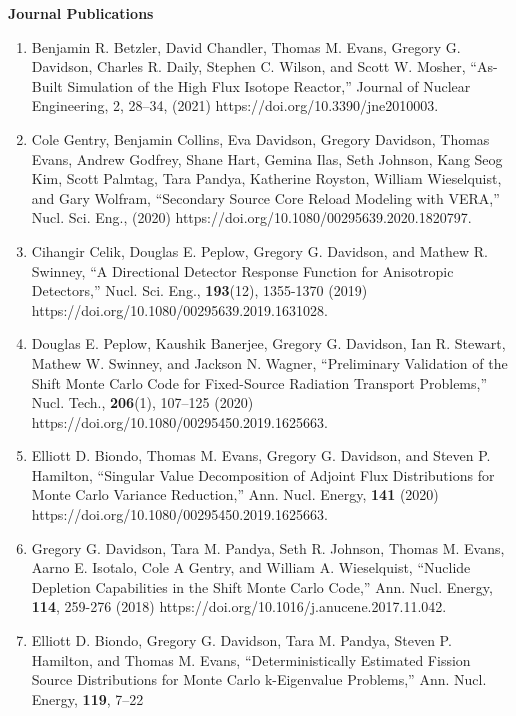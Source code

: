 \documentclass[letterpaper,11pt]{article}
\newlength{\outerbordwidth}
\newcommand{\resheading}[1]{\vspace{8pt}
  \parbox{\textwidth}{\setlength{\FrameSep}{\outerbordwidth}
    \begin{shaded}
      \setlength{\fboxsep}{0pt}\framebox[\textwidth][l]{\setlength{\fboxsep}{4pt}\fcolorbox{shadecolorB}{shadecolorB}{\textbf{\sffamily{\mbox{~}\makebox[6.762in][l]{\large #1} \vphantom{p\^{E}}}}}}
    \end{shaded}
  }\vspace{-5pt}
}
\newcommand{\leftsubheading}[1]{
  \textbf{#1\vspace{-6pt} \\}}
\begin{document}
\resheading{Publications}

\leftsubheading{Journal Publications}
\begin{enumerate}
  \item Benjamin R. Betzler, David Chandler, Thomas M. Evans, Gregory
    G. Davidson, Charles R. Daily, Stephen C. Wilson, and Scott
    W. Mosher, ``As-Built Simulation of the High Flux Isotope
    Reactor,'' Journal of Nuclear Engineering, 2, 28–34, (2021)
    https://doi.org/10.3390/jne2010003.
  \item Cole Gentry, Benjamin Collins, Eva Davidson, Gregory Davidson,
    Thomas Evans, Andrew Godfrey, Shane Hart, Gemina Ilas, Seth
    Johnson, Kang Seog Kim, Scott Palmtag, Tara Pandya, Katherine
    Royston, William Wieselquist, and Gary Wolfram, ``Secondary Source
    Core Reload Modeling with VERA,'' Nucl. Sci. Eng., (2020)
    https://doi.org/10.1080/00295639.2020.1820797.
  \item Cihangir Celik, Douglas E. Peplow, Gregory G. Davidson, and
    Mathew R. Swinney, ``A Directional Detector Response Function for
    Anisotropic Detectors,'' Nucl. Sci. Eng., \textbf{193}(12),
    1355-1370 (2019) https://doi.org/10.1080/00295639.2019.1631028.
  \item Douglas E. Peplow, Kaushik Banerjee, Gregory G. Davidson, Ian
    R. Stewart, Mathew W. Swinney, and Jackson N. Wagner, ``Preliminary
    Validation of the Shift Monte Carlo Code for Fixed-Source
    Radiation Transport Problems,'' Nucl. Tech., \textbf{206}(1),
    107--125 (2020) https://doi.org/10.1080/00295450.2019.1625663.
  \item Elliott D. Biondo, Thomas M. Evans, Gregory G. Davidson, and
    Steven P. Hamilton, ``Singular Value Decomposition of Adjoint Flux
    Distributions for Monte Carlo Variance Reduction,''
    Ann. Nucl. Energy, \textbf{141} (2020)
    https://doi.org/10.1080/00295450.2019.1625663. 
  \item Gregory G. Davidson, Tara M. Pandya, Seth R. Johnson, Thomas
    M. Evans, Aarno E. Isotalo, Cole A Gentry, and William
    A. Wieselquist, ``Nuclide Depletion Capabilities in the Shift Monte
    Carlo Code,'' Ann. Nucl. Energy, \textbf{114}, 259-276 (2018)
    https://doi.org/10.1016/j.anucene.2017.11.042.
  \item Elliott D. Biondo, Gregory G. Davidson, Tara M. Pandya,
    Steven P. Hamilton, and Thomas M. Evans, ``Deterministically
    Estimated Fission Source Distributions for Monte Carlo
    k-Eigenvalue Problems,'' Ann. Nucl. Energy, \textbf{119}, 7--22

\end{enumerate}
\end{document}
